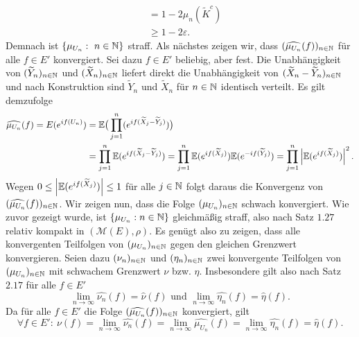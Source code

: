 \begin{proof*}
\begin{align*}
                                                              &= 1 - 2\mu_n(\tilde{K}^c) \\\
                                                              &\geq 1 - 2 \varepsilon.                                              
    \end{align*}
    Demnach ist $\{\mu_{U_n}: \ n \in \mathbb{N}\}$ straff. 
    Als nächstes zeigen wir, dass $(\widehat{\mu_{U_n}}(f))_{n \in \mathbb{N}}$ für alle $f \in E'$ konvergiert. Sei dazu $f \in E'$ beliebig, aber fest. 
    Die Unabhängigkeit von $(\widetilde{Y}_n)_{n \in \mathbb{N}}$ und $(\widetilde{X}_n)_{n \in \mathbb{N}}$ liefert direkt die Unabhängigkeit von $(\widetilde{X}_n - \widetilde{Y}_n)_{n \in \mathbb{N}}$
    und nach Konstruktion sind $\tilde{Y}_n$ und $\tilde{X}_n$ für $n \in \mathbb{N}$ identisch verteilt. Es gilt demzufolge  
    \begin{align*}
        \widehat{\mu_{U_n}}(f) = E(e^{if(U_n)}) &= \mathbb{E}\big(\prod_{j=1}^n(e^{if(\widetilde{X}_j-\widetilde{Y}_j)})\big) \\\
                                                &= \prod_{j=1}^n \mathbb{E}(e^{if(\widetilde{X}_j-\widetilde{Y}_j)})
                                                 = \prod_{j=1}^n \mathbb{E}(e^{if(\widetilde{X}_j)})\mathbb{E}(e^{-if(\widetilde{Y}_j)})
                                                 = \prod_{j=1}^n \left| \mathbb{E}(e^{if(\widetilde{X}_j)}) \right|^2.
    \end{align*}
    Wegen $0 \leq \left| \mathbb{E}(e^{if(\widetilde{X}_j)}) \right| \leq 1$ für alle $j \in \mathbb{N}$ folgt daraus die Konvergenz von $(\widehat{\mu_{U_n}}(f))_{n \in \mathbb{N}}$. 
    Wir zeigen nun, dass die Folge $(\mu_{U_n})_{n \in \mathbb{N}}$ schwach konvergiert. 
    Wie zuvor gezeigt wurde, ist $\{\mu_{U_n}: n \in \mathbb{N}\}$ gleichmäßig straff, also nach Satz $1.27$ relativ kompakt in $(\mathcal{M}(E), \rho)$. 
    Es genügt also zu zeigen, dass alle konvergenten Teilfolgen von $(\mu_{U_n})_{n \in \mathbb{N}}$ gegen den gleichen Grenzwert konvergieren. 
    Seien dazu $(\nu_n)_{n \in \mathbb{N}}$ und $(\eta_n)_{n \in \mathbb{N}}$ zwei konvergente Teilfolgen von $(\mu_{U_n})_{n \in \mathbb{N}}$ mit schwachem Grenzwert $\nu$ bzw. $\eta$. 
    Insbesondere gilt also nach Satz $2.17$ für alle $f \in E'$
    $$
        \lim_{n \to \infty} \widehat{\nu_n}(f) = \widehat{\nu}(f) \text{ und } \lim_{n \to \infty} \widehat{\eta_n}(f) = \widehat{\eta}(f). 
    $$
    Da für alle $f \in E'$ die Folge $(\widehat{\mu_{U_n}}(f))_{n \in \mathbb{N}}$ konvergiert, gilt 
    $$
        \forall f \in E': \ \nu(f) = \lim_{n \to \infty} \widehat{\nu_n}(f) = \lim_{n \to \infty}\widehat{\mu_{U_n}}(f) = \lim_{n \to \infty}\widehat{\eta_n}(f) = \widehat{\eta}(f). 
$$
\end{proof*}
